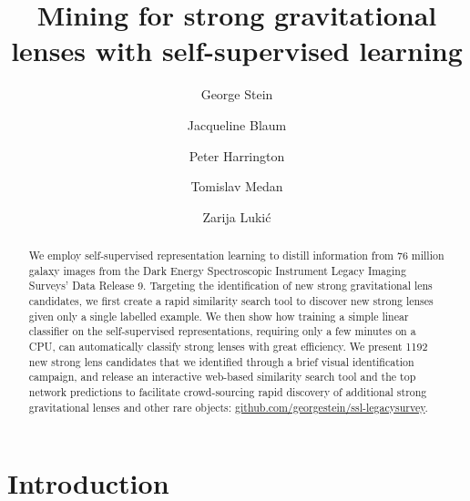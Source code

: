 \documentclass{aastex631}
\begin{document}
\title{Mining for strong gravitational lenses with self-supervised learning}

\author[0000-0002-5193-516X]{George Stein}

\author[0000-0003-1142-3095]{Jacqueline Blaum}

\author{Peter Harrington}

\author{Tomislav Medan}

\author{Zarija Luki\'{c}}



\begin{abstract}
We employ self-supervised representation learning to distill information from 76 million galaxy images from the Dark Energy Spectroscopic Instrument Legacy Imaging Surveys' Data Release 9. Targeting the identification of new strong gravitational lens candidates, we first create a rapid similarity search tool to discover new strong lenses given only a single labelled example. We then show how training a simple linear classifier on the self-supervised representations, requiring only a few minutes on a CPU, can automatically classify strong lenses with great efficiency. We present 1192 new strong lens candidates that we identified through a brief visual identification campaign, and release an interactive web-based similarity search tool and the top network predictions to facilitate crowd-sourcing rapid discovery of additional strong gravitational lenses and other rare objects: \href{https://github.com/georgestein/ssl-legacysurvey}{github.com/georgestein/ssl-legacysurvey}. 
\end{abstract}

\section{Introduction} \label{sec:intro}
\end{document}
